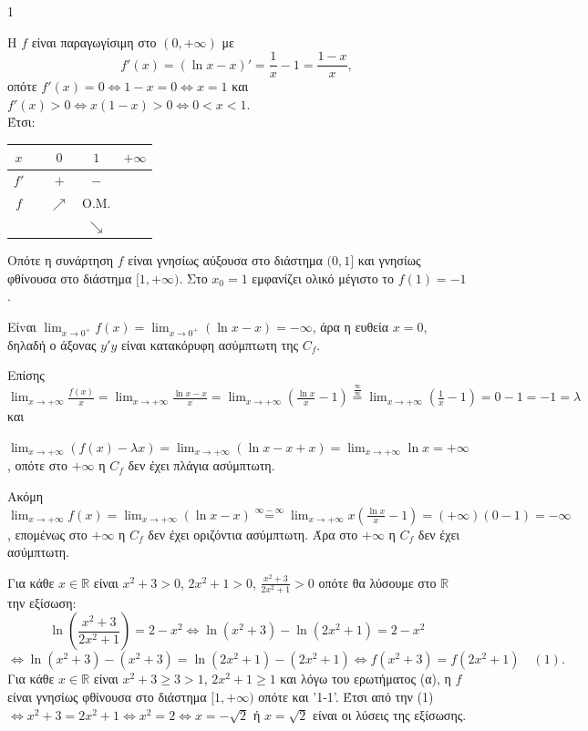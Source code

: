 \begin{ylh}{1}
    \item [Ύλη από εικόνα]
\end{ylh}
\begin{alist}
\item Η $f$ είναι παραγωγίσιμη στο $(0,+\infty)$ με
\[ f'(x) = (\ln x - x)' = \frac{1}{x} - 1 = \frac{1-x}{x}, \]
οπότε $f'(x) = 0 \Leftrightarrow 1-x = 0 \Leftrightarrow x=1$ και $f'(x) > 0 \Leftrightarrow x(1-x) > 0 \Leftrightarrow 0 < x < 1$. \\
Έτσι:
\begin{center}
\renewcommand{\arraystretch}{1.5}
\begin{tabular}{|c|c|c|c|c|}
\hline
$x$ & \multicolumn{1}{c|}{} & $0$ & $1$ & $+\infty$ \\
\hline
$f'$ & \cellcolor{gray!20} & \multicolumn{1}{c|}{$+$} & \multicolumn{1}{c|}{$-$} \\
\hline
$f$ & \cellcolor{gray!20} & \multicolumn{1}{c|}{$\nearrow$} & \multicolumn{1}{c|}{O.M.} \\
\multicolumn{2}{|c|}{} & & \multicolumn{1}{c|}{$\searrow$} \\
\hline
\end{tabular}
\end{center}
Οπότε η συνάρτηση $f$ είναι γνησίως αύξουσα στο διάστημα $(0,1]$ και γνησίως φθίνουσα στο διάστημα $[1,+\infty)$. Στο $x_0=1$ εμφανίζει ολικό μέγιστο το $f(1)=-1$.

\item Είvαι $\lim_{x \to 0^+} f(x) = \lim_{x \to 0^+} (\ln x - x) = -\infty$, άρα η ευθεία $x=0$, δηλαδή ο άξονας $y'y$ είναι κατακόρυφη ασύμπτωτη της $C_f$.

Επίσης $\lim_{x \to +\infty} \frac{f(x)}{x} = \lim_{x \to +\infty} \frac{\ln x - x}{x} = \lim_{x \to +\infty} \left(\frac{\ln x}{x} - 1\right) \overset{\frac{\infty}{\infty}}{=} \lim_{x \to +\infty} \left(\frac{1}{x} - 1\right) = 0-1 = -1 = \lambda$ και

$\lim_{x \to +\infty} (f(x) - \lambda x) = \lim_{x \to +\infty} (\ln x - x + x) = \lim_{x \to +\infty} \ln x = +\infty$, οπότε στο $+\infty$ η $C_f$ δεν έχει πλάγια ασύμπτωτη.

Ακόμη $\lim_{x \to +\infty} f(x) = \lim_{x \to +\infty} (\ln x - x) \overset{\infty-\infty}{=} \lim_{x \to +\infty} x \left(\frac{\ln x}{x} - 1\right) = (+\infty)(0-1) = -\infty$, επομένως στο $+\infty$ η $C_f$ δεν έχει οριζόντια ασύμπτωτη. Άρα στο $+\infty$ η $C_f$ δεν έχει ασύμπτωτη.

\item Για κάθε $x \in \mathbb{R}$ είναι $x^2+3>0$, $2x^2+1>0$, $\frac{x^2+3}{2x^2+1} > 0$ οπότε θα λύσουμε στο $\mathbb{R}$ την εξίσωση:
\[ \ln \left(\frac{x^2+3}{2x^2+1}\right) = 2 - x^2 \Leftrightarrow \ln(x^2+3) - \ln(2x^2+1) = 2 - x^2 \]
\[ \Leftrightarrow \ln(x^2+3) - (x^2+3) = \ln(2x^2+1) - (2x^2+1) \Leftrightarrow f(x^2+3) = f(2x^2+1) \quad (1). \]
Για κάθε $x \in \mathbb{R}$ είναι $x^2+3 \ge 3 > 1$, $2x^2+1 \ge 1$ και λόγω του ερωτήματος (α), η $f$ είναι γνησίως φθίνουσα στο διάστημα $[1,+\infty)$ οπότε και '1-1'. Έτσι από την (1) $\Leftrightarrow x^2+3 = 2x^2+1 \Leftrightarrow x^2 = 2 \Leftrightarrow x = -\sqrt{2}$ ή $x = \sqrt{2}$ είναι οι λύσεις της εξίσωσης.
\end{alist}